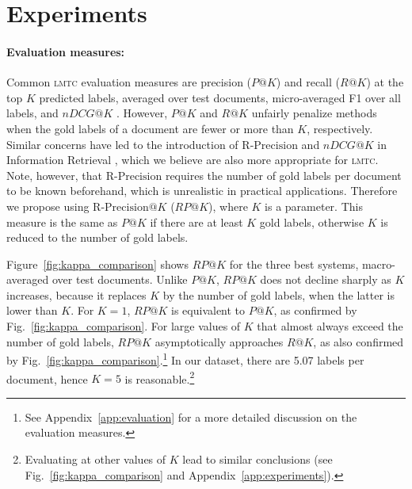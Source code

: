 \documentclass[11pt,a4paper]{article}
\newcommand{\lmtc}{\textsc{lmtc}\xspace}
\begin{document}
\section{Experiments}
\label{sec:experiments}

\paragraph{Evaluation measures:} Common \lmtc evaluation measures are precision ($P@K$) and recall ($R@K$) at the top $K$ predicted labels, averaged over test documents, micro-averaged F1 over all labels, and $nDCG@K$ \cite{Manning2009}. However, $P@K$ and $R@K$ unfairly penalize methods when the gold labels of a document are fewer or more than $K$, respectively. Similar concerns have led to the introduction of $\mathrm{R}\text{-}\mathrm{Precision}$ and $nDCG@K$ in Information Retrieval \cite{Manning2009}, which we believe are also more appropriate for \lmtc. Note, however, that $\mathrm{R}\text{-}\mathrm{Precision}$ requires the number of gold labels per document to be known beforehand, which is unrealistic in practical applications. Therefore we propose using $\mathrm{R}\text{-}\mathrm{Precision}@K$ ($RP@K$), where $K$ is a parameter. This measure is the same as $P@K$ if there are at least $K$ gold labels, otherwise $K$ is reduced to the number of gold labels. 

Figure~\ref{fig:kappa_comparison} shows $RP@K$ for the three best systems, macro-averaged over test documents. Unlike $P@K$, $RP@K$ does not decline sharply as $K$ increases, because it replaces $K$ by the number of gold labels, when the latter is lower than $K$. 
For $K=1$, $RP@K$ is equivalent to $P@K$, as confirmed by Fig.~\ref{fig:kappa_comparison}. For large values of $K$ that almost always exceed the number of gold labels, $RP@K$ asymptotically approaches $R@K$, as also confirmed by Fig.~\ref{fig:kappa_comparison}.\footnote{See Appendix~\ref{app:evaluation} for a more detailed discussion on the evaluation measures.} In our dataset, there are 5.07 labels per document, hence  $K=5$ is reasonable.\footnote{Evaluating at other values of $K$ lead to similar conclusions (see Fig.~\ref{fig:kappa_comparison} and Appendix~\ref{app:experiments}).}
\end{document}
